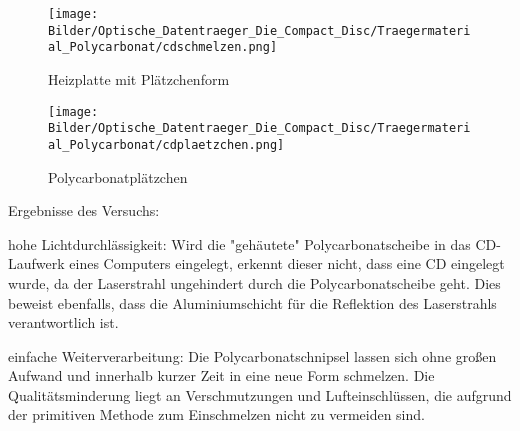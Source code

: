 {    \begin{figure}[h]
        \begin{center}
            \begin{minipage}[t]{0.4\textwidth}
                \begin{center}
                    \texttt{[image: Bilder/Optische\_Datentraeger\_Die\_Compact\_Disc/Traegermaterial\_Polycarbonat/cdschmelzen.png]}
                    \caption[Heizplatte mit Plätzchenform]{Heizplatte mit Plätzchenform}
                    \label{fig:cdschmelzen}
                \end{center}
            \end{minipage}
            \hspace{0.025\textwidth}
            \begin{minipage}[t]{0.4\textwidth}
                \begin{center}
                    \texttt{[image: Bilder/Optische\_Datentraeger\_Die\_Compact\_Disc/Traegermaterial\_Polycarbonat/cdplaetzchen.png]}
                    \caption[\glqq Polycarbonatplätzchen\grqq{}]{\glqq Polycarbonatplätzchen\grqq{}}
                    \label{fig:cdplaetzchen}
                \end{center}
            \end{minipage}
        \end{center}
    \end{figure}
}{}

Ergebnisse des Versuchs:
\begin{enumerate*}
    \item hohe Lichtdurchlässigkeit: Wird die "gehäutete" Polycarbonatscheibe in das CD-Laufwerk eines Computers eingelegt, erkennt dieser nicht, dass eine CD eingelegt wurde, da der Laserstrahl ungehindert durch die Polycarbonatscheibe geht. Dies beweist ebenfalls, dass die Aluminiumschicht für die Reflektion des Laserstrahls verantwortlich ist.
    \item einfache Weiterverarbeitung: Die Polycarbonatschnipsel lassen sich ohne großen Aufwand und innerhalb kurzer Zeit in eine neue Form schmelzen. Die Qualitätsminderung liegt an Verschmutzungen und Lufteinschlüssen, die aufgrund der primitiven Methode zum Einschmelzen nicht zu vermeiden sind.
\end{enumerate*}
